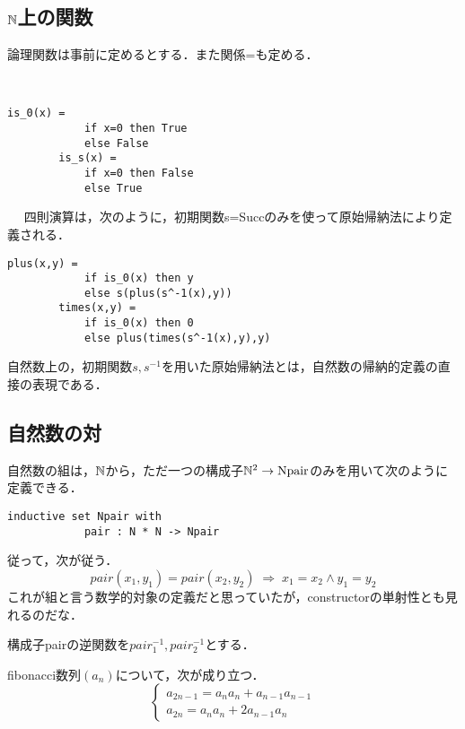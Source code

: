 \documentclass[uplatex, 12pt, dvipdfmx]{jsreport}
\begin{document}
\subsection{$\mathbb{N}$上の関数}

論理関数は事前に定めるとする．また関係=も定める．

\begin{example}　
    
    \begin{lstlisting}[caption=isZero / isS]
        is_0(x) = 
            if x=0 then True
            else False
        is_s(x) = 
            if x=0 then False
            else True
    \end{lstlisting}
\end{example}

\begin{example}[四則演算]　
    四則演算は，次のように，初期関数s=Succのみを使って原始帰納法により定義される．
    \begin{lstlisting}[caption=plus / times]
        plus(x,y) =
            if is_0(x) then y
            else s(plus(s^-1(x),y))
        times(x,y) =
            if is_0(x) then 0
            else plus(times(s^-1(x),y),y)
    \end{lstlisting}
\end{example}

自然数上の，初期関数$s,s^{-1}$を用いた原始帰納法とは，自然数の帰納的定義の直接の表現である．

\subsection{自然数の対}

\begin{definition}[組]
    自然数の組は，$\mathbb{N}$から，ただ一つの構成子$\mathbb{N}^2\to\mathrm{Npair}$のみを用いて次のように定義できる．
    \begin{lstlisting}[caption=Npair]
        inductive set Npair with
            pair : N * N -> Npair
    \end{lstlisting}
    従って，次が従う．
    \[ pair(x_1,y_1)=pair(x_2,y_2)\;\Rightarrow\; x_1=x_2\land y_1=y_2 \]
    これが組と言う数学的対象の定義だと思っていたが，constructorの単射性とも見れるのだな．
\end{definition}
\begin{definition}
    構成子pairの逆関数を$pair_1^{-1},pair_2^{-1}$とする．
\end{definition}

\begin{proposition}
    fibonacci数列$(a_n)$について，次が成り立つ．
    \[ \begin{cases}
        a_{2n-1} = a_na_n+a_{n-1}a_{n-1}\\
        a_{2n} = a_na_n + 2a_{n-1}a_n
    \end{cases} \]
\end{proposition}
\end{document}
